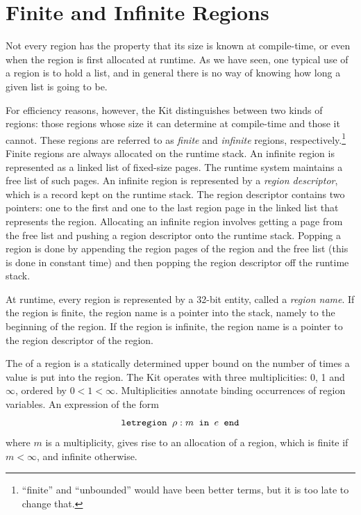 \documentclass[12pt]{book}
\begin{document}
\section{Finite and Infinite Regions}
\label{fininf.sec}
Not every region has the property that its size is known at compile-time, 
or even when the region is first allocated at runtime. 
As we have seen, one typical use of a region is to hold
a list, and in general there is no way of knowing how long a given list
is going to be. 


For efficiency reasons, however, the Kit distinguishes 
between two kinds of regions: those regions whose
size it can determine at compile-time and those it cannot. 
%
These regions are referred to as 
%
{\em finite} and 
%
{\em infinite} regions, respectively.\footnote{``finite'' and
  ``unbounded'' would have been better terms, but it is too late to
  change that.}  Finite regions are always allocated on the
%
runtime stack.  An infinite region is represented as a linked list of
fixed-size 
%
pages.  The runtime system maintains a free list of such pages. An
infinite region is represented by a 
%
{\em region descriptor}, which is a record kept on the runtime stack.
The region descriptor contains two pointers: one to the first and one
to the last region page in the linked list that represents the region.
Allocating an infinite region involves getting a page from the
%
free list and pushing a region descriptor onto the
runtime stack. Popping a region is done by appending the region pages
of the region and the free list (this is done in constant time) and
then popping the region descriptor off the runtime stack.

At runtime, every region is represented by a 32-bit entity, called a
%
{\em region name}. If the region is finite, the region name is a
pointer into the stack, namely to the beginning of the region. If the
region is infinite, the region name is a pointer to the region
descriptor of the region.

The  of a region is a statically determined upper
bound on the number of times a value is put into the region. The Kit
operates with three multiplicities: 0, 1 and $\infty$, ordered
by $0<1<\infty$. Multiplicities annotate
binding occurrences of region variables. An expression of the form
$$\hbox{\tt letregion $\rho:m$ in $e$ end}$$
where $m$ is a multiplicity,
gives rise to an allocation of a region, which is finite if $m<\infty$, and
infinite otherwise.
\end{document}
